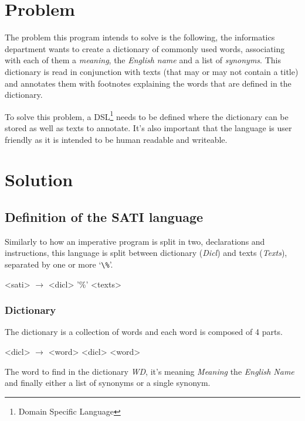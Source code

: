 \documentclass[a4paper]{report}
\begin{document}
\chapter{Problem}

The problem this program intends to solve is the following, the informatics
department wants to create a dictionary of commonly used words, associating
with each of them a \textit{meaning}, the \textit{English name} and a list of
\textit{synonyms}. This dictionary is read in conjunction with texts (that may
or may not contain a title) and annotates them with footnotes explaining the
words that are defined in the dictionary.

To solve this problem, a DSL\footnote{Domain Specific Language} needs to be
defined where the dictionary can be stored as well as texts to annotate. It's
also important that the language is user friendly as it is intended to be
human readable and writeable.

\chapter{Solution}\label{cha:solution}

\section{Definition of the SATI language}

Similarly to how an imperative
program is split in two, declarations and instructions, this language is split
between dictionary (\textit{Dicl}) and texts (\textit{Texts}), separated by one or more `\verb!\%!'.

\begin{grammar}
    <sati> $\to$ <dicl> '\%' <texts>
\end{grammar}

\subsection{Dictionary}

The dictionary is a collection of words and each word is composed of 4 parts.

\begin{grammar}
    <dicl> $\to$ <word>
    \alt <dicl> <word>
\end{grammar}

The word to find in the dictionary \textit{WD}, it's meaning \textit{Meaning}
the \textit{English Name} and finally either a list of synonyms or a single
synonym.
\end{document}
